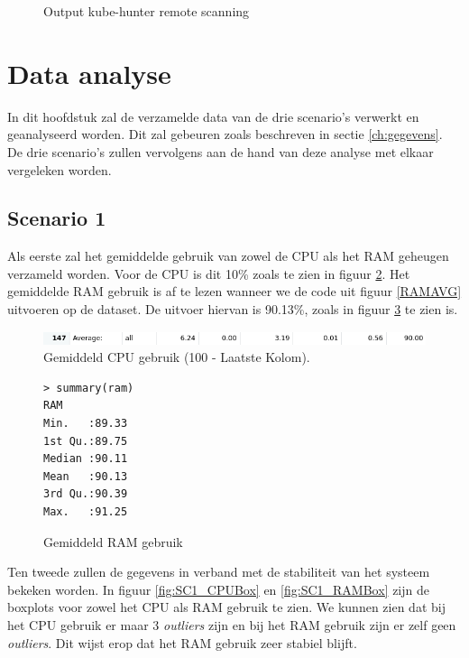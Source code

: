 \begin{figure}[h] 
	\centering
	\inputminted[fontsize=\footnotesize,linenos]{yaml}{files/hunterJob.yaml}
	\caption{Output kube-hunter remote scanning}
	\label{hunterjob}
\end{figure}

\clearpage
\section{Data analyse} 
In dit hoofdstuk zal de verzamelde data van de drie scenario's verwerkt en geanalyseerd worden. Dit zal gebeuren zoals beschreven in sectie \ref{ch:gegevens}. De drie scenario's zullen vervolgens aan de hand van deze analyse met elkaar vergeleken worden.

\clearpage
\subsection{Scenario 1}
Als eerste zal het gemiddelde gebruik van zowel de CPU als het RAM geheugen verzameld worden. Voor de CPU is dit 10\% zoals te zien in figuur \ref{fig:SC1_CPUAVG}. Het gemiddelde RAM gebruik is af te lezen wanneer we de code uit figuur \ref{RAMAVG} uitvoeren op de dataset. De uitvoer hiervan is 90.13\%, zoals in figuur \ref{SC1_RAMAVG} te zien is.
\begin{figure}[h]
	\centering
	\includegraphics[width=\linewidth]{img/SC1_CPUAVG.png}
	\caption{Gemiddeld CPU gebruik (100 - Laatste Kolom).}
	\label{fig:SC1_CPUAVG}
\end{figure}
\begin{figure}[h]
	\centering
	\begin{verbatim} 
> summary(ram)
RAM       
Min.   :89.33  
1st Qu.:89.75  
Median :90.11  
Mean   :90.13  
3rd Qu.:90.39  
Max.   :91.25
	\end{verbatim}
	\caption{Gemiddeld RAM gebruik}
	\label{SC1_RAMAVG}
\end{figure}

Ten tweede zullen de gegevens in verband met de stabiliteit van het systeem bekeken worden. In figuur \ref{fig:SC1_CPUBox} en \ref{fig:SC1_RAMBox} zijn de boxplots voor zowel het CPU als RAM gebruik te zien. We kunnen zien dat bij het CPU gebruik er maar 3 \textit{outliers} zijn en bij het RAM gebruik zijn er zelf geen \textit{outliers}. Dit wijst erop dat het RAM gebruik zeer stabiel blijft. 

